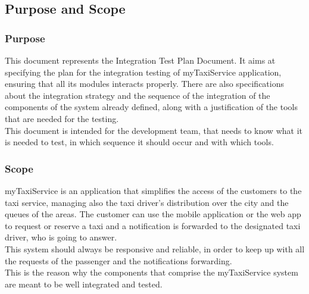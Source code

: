 \documentclass[18pt,oneside,a4paper, titlepage]{article}
\begin{document}
	\subsection{Purpose	and	Scope}
		\subsubsection{Purpose}
		This document represents the Integration Test Plan Document. It aims at specifying the plan for the integration testing of myTaxiService application, ensuring that all its modules interacts properly. There are also specifications about the integration strategy and the sequence of the integration of the components of the system already defined, along with a justification of the tools that are needed for the testing.\\
		This document is intended for the development team, that needs to know what it is needed to test, in which sequence it should occur and with which tools.
		\subsubsection{Scope}
		myTaxiService is an application that simplifies the access of the customers to the taxi service, managing also the taxi driver's distribution over the city and the queues of the areas. The customer can use the mobile application or the web app to request or reserve a taxi and a notification is forwarded to the designated taxi driver, who is going to answer.\\ This system should always be responsive and reliable, in order to keep up with all the requests of the passenger and the notifications forwarding.\\ This is the reason why the components that comprise the myTaxiService system are meant to be well integrated and tested.
\end{document}
